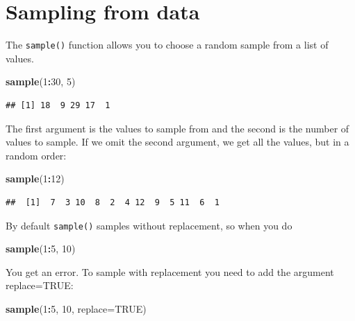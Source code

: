 \documentclass[]{book}
\newenvironment{Shaded}{\begin{snugshade}}{\end{snugshade}}
\newcommand{\DataTypeTok}[1]{\textcolor[rgb]{0.13,0.29,0.53}{#1}}
\newcommand{\DecValTok}[1]{\textcolor[rgb]{0.00,0.00,0.81}{#1}}
\newcommand{\KeywordTok}[1]{\textcolor[rgb]{0.13,0.29,0.53}{\textbf{#1}}}
\newcommand{\NormalTok}[1]{#1}
\newcommand{\OperatorTok}[1]{\textcolor[rgb]{0.81,0.36,0.00}{\textbf{#1}}}
\newcommand{\OtherTok}[1]{\textcolor[rgb]{0.56,0.35,0.01}{#1}}
\begin{document}
\hypertarget{sampling-from-data}{%
\section{Sampling from data}\label{sampling-from-data}}

The \texttt{sample()} function allows you to choose a random sample from a list of values.

\begin{Shaded}
\begin{Highlighting}[]
\KeywordTok{sample}\NormalTok{(}\DecValTok{1}\OperatorTok{:}\DecValTok{30}\NormalTok{, }\DecValTok{5}\NormalTok{)}
\end{Highlighting}
\end{Shaded}

\begin{verbatim}
## [1] 18  9 29 17  1
\end{verbatim}

The first argument is the values to sample from and the second is the number of values to sample. If we omit the second argument, we get all the values, but in a random order:

\begin{Shaded}
\begin{Highlighting}[]
\KeywordTok{sample}\NormalTok{(}\DecValTok{1}\OperatorTok{:}\DecValTok{12}\NormalTok{)}
\end{Highlighting}
\end{Shaded}

\begin{verbatim}
##  [1]  7  3 10  8  2  4 12  9  5 11  6  1
\end{verbatim}

By default \texttt{sample()} samples without replacement, so when you do

\begin{Shaded}
\begin{Highlighting}[]
\KeywordTok{sample}\NormalTok{(}\DecValTok{1}\OperatorTok{:}\DecValTok{5}\NormalTok{, }\DecValTok{10}\NormalTok{)}
\end{Highlighting}
\end{Shaded}

You get an error. To sample with replacement you need to add the argument replace=TRUE:

\begin{Shaded}
\begin{Highlighting}[]
\KeywordTok{sample}\NormalTok{(}\DecValTok{1}\OperatorTok{:}\DecValTok{5}\NormalTok{, }\DecValTok{10}\NormalTok{, }\DataTypeTok{replace=}\OtherTok{TRUE}\NormalTok{)}
\end{Highlighting}
\end{Shaded}
\end{document}
